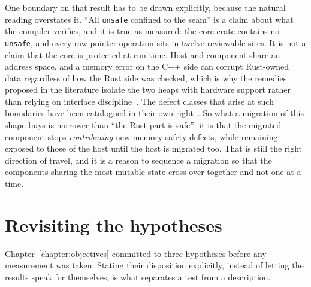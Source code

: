 \documentclass[english,twoside,openright,a4paper,censored,csm,software-track-2020]{HYthesisML}
\begin{document}
One boundary on that result has to be drawn explicitly, because the natural reading overstates
it. ``All \texttt{unsafe} confined to the seam'' is a claim about what the compiler verifies,
and it is true as measured: the core crate contains no \texttt{unsafe}, and every raw-pointer
operation sits in twelve reviewable sites. It is not a claim that the core is protected at run
time. Host and component share an address space, and a memory error on the C++ side can corrupt
Rust-owned data regardless of how the Rust side was checked, which is why the remedies proposed
in the literature isolate the two heaps with hardware support rather than relying on interface
discipline~\cite{rivera2021galeed,kirth2022pkrusafe}. The defect classes that arise at such
boundaries have been catalogued in their own right~\cite{li2022crosslang}. So what a migration
of this shape buys is narrower than ``the Rust part is safe'': it is that the migrated
component stops \emph{contributing} new memory-safety defects, while remaining exposed to those
of the host until the host is migrated too. That is still the right direction of travel, and it
is a reason to sequence a migration so that the components sharing the most mutable state cross
over together and not one at a time.

\section{Revisiting the hypotheses}
Chapter~\ref{chapter:objectives} committed to three hypotheses before any measurement was
taken. Stating their disposition explicitly, instead of letting the results speak for
themselves, is what separates a test from a
description.
\end{document}
